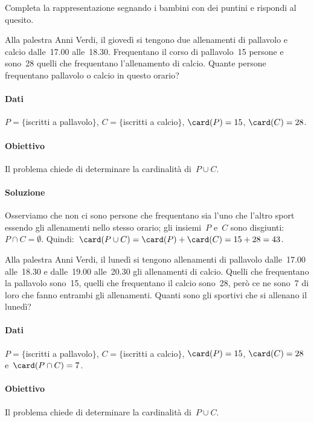 \begin{exrig}
\begin{esempio}
Completa la rappresentazione segnando i bambini con dei puntini e rispondi al quesito.
\end{esempio}

\begin{esempio}
Alla palestra Anni Verdi, il giovedì si tengono due allenamenti di pallavolo e calcio dalle~17.00 alle~18.30. Frequentano il corso di
pallavolo~15 persone e sono~28 quelli che frequentano l'allenamento di calcio. Quante persone frequentano
pallavolo o calcio in questo orario?
\paragraph{Dati} $P=\{$iscritti a pallavolo$\}$, $C=\{$iscritti a calcio$\}$, $\card(P)=15$, $\card(C)=28$.
\paragraph{Obiettivo} Il problema chiede di determinare la cardinalità di~$P\cup C$.
\paragraph{Soluzione} Osserviamo che non ci sono persone che frequentano sia
l'uno che l'altro sport essendo gli allenamenti nello stesso orario; gli insiemi~$P$ e~$C$
sono disgiunti:~$P\cap C=\emptyset $. Quindi:~$\card(P\cup C)=\card(P)+\card(C)=15+28=43$.

% 
\end{esempio}

\begin{esempio}
\begin{multicols}{2}
 Alla palestra Anni Verdi, il lunedì si tengono allenamenti di pallavolo dalle~17.00 alle~18.30 e dalle~19.00 alle~20.30 gli
allenamenti di calcio. Quelli che frequentano la pallavolo sono~15, quelli che frequentano il calcio sono~28, però ce ne sono~7 di loro
che fanno entrambi gli allenamenti. Quanti sono gli sportivi che si allenano il lunedì?
\begin{center}
 
 \end{center}
\end{multicols}
\paragraph{Dati} $P=\{$iscritti a pallavolo$\}$, $C=\{$iscritti a calcio$\}$, $\card(P)=15$, $\card(C)=28$ e~$\card(P\cap C)=7$.\paragraph{Obiettivo} Il problema chiede di determinare la cardinalità di~$P\cup C$.

\end{esempio}
\end{exrig}
